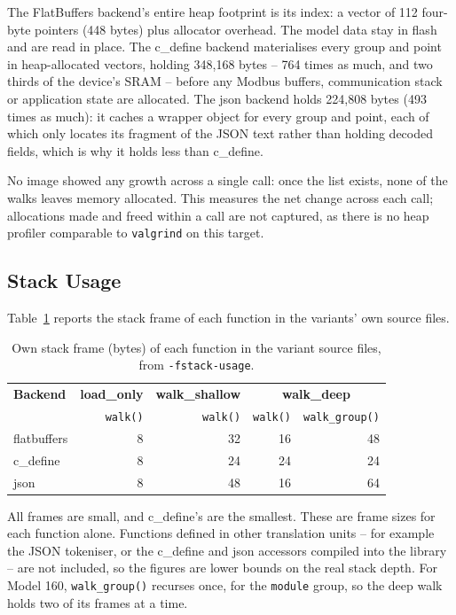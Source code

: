 \documentclass{article}
\begin{document}
The FlatBuffers backend's entire heap footprint is its index: a vector of 112 four-byte pointers (448 bytes) plus allocator overhead. The model data stay in flash and are read in place. The c\_define backend materialises every group and point in heap-allocated vectors, holding 348{,}168 bytes -- 764 times as much, and two thirds of the device's SRAM -- before any Modbus buffers, communication stack or application state are allocated. The json backend holds 224{,}808 bytes (493 times as much): it caches a wrapper object for every group and point, each of which only locates its fragment of the JSON text rather than holding decoded fields, which is why it holds less than c\_define.

No image showed any growth across a single call: once the list exists, none of the walks leaves memory allocated. This measures the net change across each call; allocations made and freed within a call are not captured, as there is no heap profiler comparable to \texttt{valgrind} on this target.

\subsection{Stack Usage}
Table~\ref{tab:stack} reports the stack frame of each function in the variants' own source files.

\begin{table}[h]
\centering
\begin{tabular}{|l|r|r|r|r|}
\hline
\textbf{Backend} & \textbf{load\_only} & \textbf{walk\_shallow} & \multicolumn{2}{c|}{\textbf{walk\_deep}} \\
 & \texttt{walk()} & \texttt{walk()} & \texttt{walk()} & \texttt{walk\_group()} \\
\hline
flatbuffers & 8 & 32 & 16 & 48 \\
c\_define   & 8 & 24 & 24 & 24 \\
json        & 8 & 48 & 16 & 64 \\
\hline
\end{tabular}
\caption{Own stack frame (bytes) of each function in the variant source files, from \texttt{-fstack-usage}.}
\label{tab:stack}
\end{table}

All frames are small, and c\_define's are the smallest. These are frame sizes for each function alone. Functions defined in other translation units -- for example the JSON tokeniser, or the c\_define and json accessors compiled into the library -- are not included, so the figures are lower bounds on the real stack depth. For Model 160, \texttt{walk\_group()} recurses once, for the \texttt{module} group, so the deep walk holds two of its frames at a time.
\end{document}
